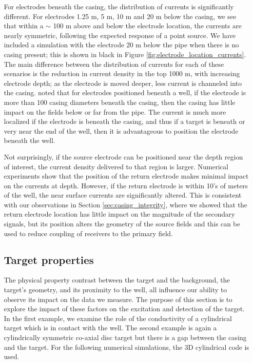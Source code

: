 \documentclass[extra,mreferee]{gji}
\begin{document}
For electrodes beneath the casing, the distribution of currents is significantly different. For electrodes 1.25 m, 5 m, 10 m and 20 m below the casing, we see that within a $\sim$ 100 m above and below the electrode location, the currents are nearly symmetric, following the expected response of a point source. We have included a simulation with the electrode 20 m below the pipe when there is no casing present; this is shown in black in Figure \ref{fig:electrode_location_currents}. The main difference between the distribution of currents for each of these scenarios is the reduction in current density in the top 1000 m, with increasing electrode depth; as the electrode is moved deeper, less current is channeled into the casing. \cite{Schenkel1990} noted that for electrodes positioned beneath a well, if the electrode is more than 100 casing diameters beneath the casing, then the casing has little impact on the fields below or far from the pipe. The current is much more localized if the electrode is beneath the casing, and thus if a target is beneath or very near the end of the well, then it is advantageous to position the electrode beneath the well.

Not surprisingly, if the source electrode can be positioned near the depth region of interest, the current density delivered to that region is larger. Numerical experiments show that the position of the return electrode makes minimal impact on the currents at depth. However, if the return electrode is within 10's of meters of the well, the near surface currents are significantly altered. This is consistent with our observations in Section \ref{sec:casing_integrity}, where we showed that the return electrode location has little impact on the magnitude of the secondary signals, but its position alters the geometry of the source fields and this can be used to reduce coupling of receivers to the primary field.






\subsection{Target properties}

The physical property contrast between the target and the background, the target's geometry, and its proximity to the well, all influence our ability to observe its impact on the data we measure. The purpose of this section is to explore the impact of these factors on the excitation and detection of the target. In the first example, we examine the role of the conductivity of a cylindrical target which is in contact with  the well. The second example is again a cylindrically symmetric co-axial disc target but there is a gap between the casing and the target. For the following numerical simulations, the 3D cylindrical code is used.
\end{document}
